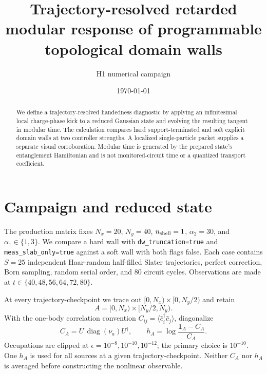 \documentclass[aps,prresearch,twocolumn,superscriptaddress,nofootinbib]{revtex4-2}
\begin{document}
\title{Trajectory-resolved retarded modular response of programmable topological domain walls}
\author{H1 numerical campaign}
\date{\today}

\begin{abstract}
We define a trajectory-resolved handedness diagnostic by applying an infinitesimal local
charge-phase kick to a reduced Gaussian state and evolving the resulting tangent in
modular time. The calculation compares hard support-terminated and soft explicit domain
walls at two controller strengths. A localized single-particle packet supplies a separate
visual corroboration. Modular time is generated by the prepared state's entanglement
Hamiltonian and is not monitored-circuit time or a quantized transport coefficient.
\end{abstract}

\maketitle

\section{Campaign and reduced state}

The production matrix fixes $N_x=20$, $N_y=40$, $n_{\rm shell}=1$,
$\alpha_2=30$, and $\alpha_1\in\{1,3\}$. We compare a hard wall with
\texttt{dw\_truncation=true} and \texttt{meas\_slab\_only=true} against a soft
wall with both flags false. Each case contains $S=25$ independent Haar-random
half-filled Slater trajectories, perfect correction, Born sampling, random serial order,
and 80 circuit cycles. Observations are made at
$t\in\{40,48,56,64,72,80\}$.

At every trajectory-checkpoint we trace out
$[0,N_x)\times[0,N_y/2)$ and retain
\begin{equation}
 A=[0,N_x)\times[N_y/2,N_y).
\end{equation}
With the one-body correlation convention
$C_{ij}=\langle\hat c_i^\dagger\hat c_j\rangle$, diagonalize
\begin{equation}
 C_A=U\,\operatorname{diag}(\nu_a)U^\dagger,
 \qquad
 h_A=\log\frac{\mathbf 1_A-C_A}{C_A}.
\end{equation}
Occupations are clipped at $\epsilon=10^{-8},10^{-10},10^{-12}$; the primary
choice is $10^{-10}$. One $h_A$ is used for all sources at a given
trajectory-checkpoint. Neither $C_A$ nor $h_A$ is averaged before constructing the
nonlinear observable.
\end{document}
